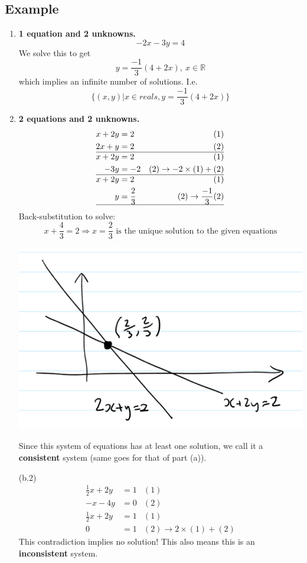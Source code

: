 \documentclass[11pt]{article}
\newcommand{\reals}{\mathbb{R}}
\begin{document}
\subsection*{Example}
\begin{enumerate}[ (a) ]
\item \textbf{1 equation and 2 unknowns.}
\[ -2x -3y = 4 \]
We solve this to get
\[ y = \frac{-1}{3}(4 + 2x),\ x \in \reals \]
which implies an infinite number of solutions. I.e.
\[ \{ (x, y) | x \in reals, y = \frac{-1}{3}(4 + 2x) \} \]

\item \textbf{2 equations and 2 unknowns.}
\begin{align*}
x + 2y &= 2 & (1) \\ 
2x + y &= 2 & (2) \\
\hline
x + 2y &= 2 & (1) \\ 
-3y &= -2 & (2) \rightarrow -2 \times (1) + (2) \\
\hline
x + 2y &= 2 & (1) \\ 
y &= \frac{2}{3} & (2) \rightarrow \frac{-1}{3}(2) \\
\hline
\end{align*}
Back-substitution to solve:
\[ x + \frac{4}{3} = 2 \Rightarrow x = \frac{2}{3} \text{ is the unique solution to the given equations} \]

\begin{center} \includegraphics[scale=0.5]{linear_system_intersect} \end{center}

Since this system of equations has at least one solution, we call it a \textbf{consistent} system (same goes for that of part (a)).

(b.2)
\begin{align*}
\frac{1}{2}x + 2y &= 1 & (1) \\
-x - 4y &= 0 & (2) \\
\hline
\frac{1}{2}x + 2y &= 1 & (1) \\
0 &= 1 & (2) \rightarrow 2 \times (1) + (2)
\end{align*}
This contradiction implies no solution! This also means this is an \textbf{inconsistent} system.


\end{enumerate}
\end{document}
